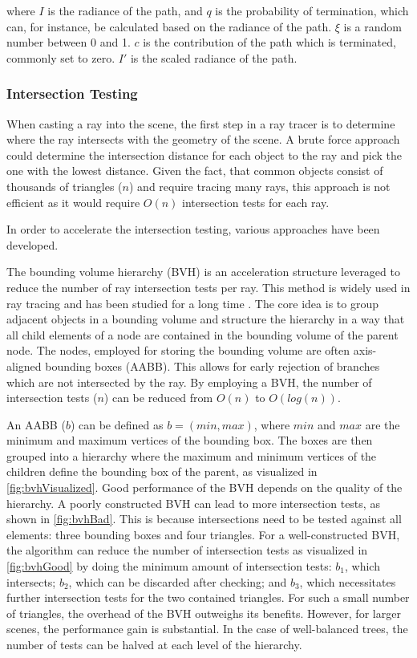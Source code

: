 where $I$ is the radiance of the path, and $q$ is the probability of termination, which can, for instance, be calculated based on the radiance of the path. $\xi$ is a random number between 0 and 1. $c$ is the contribution of the path which is terminated, commonly set to zero. $I'$ is the scaled radiance of the path.

\subsubsection{Intersection Testing}

When casting a ray into the scene, the first step in a ray tracer is to determine where the ray intersects with the geometry of the scene. A brute force approach could determine the intersection distance for each object to the ray and pick the one with the lowest distance. Given the fact, that common objects consist of thousands of triangles ($n$) and require tracing many rays, this approach is not efficient as it would require $O(n)$ intersection tests for each ray.

In order to accelerate the intersection testing, various approaches have been developed.

The bounding volume hierarchy (\gls{BVH}) is an acceleration structure leveraged to reduce the number of ray intersection tests per ray. This method is widely used in ray tracing and has been studied for a long time \cite{rubinWhittedBvh}. The core idea is to group adjacent objects in a bounding volume and structure the hierarchy in a way that all child elements of a node are contained in the bounding volume of the parent node. The nodes, employed for storing the bounding volume are often axis-aligned bounding boxes (\gls{AABB}). This allows for early rejection of branches which are not intersected by the ray. By employing a \gls{BVH}, the number of intersection tests ($n$) can be reduced from $O(n)$ to $O(log(n))$.

An \gls{AABB} ($b$) can be defined as $b = (min, max)$, where $min$ and $max$ are the minimum and maximum vertices of the bounding box. The boxes are then grouped into a hierarchy where the maximum and minimum vertices of the children define the bounding box of the parent, as visualized in \autoref{fig:bvhVisualized}. Good performance of the \gls{BVH} depends on the quality of the hierarchy. A poorly constructed \gls{BVH} can lead to more intersection tests, as shown in \autoref{fig:bvhBad}. This is because intersections need to be tested against all elements: three bounding boxes and four triangles. For a well-constructed \gls{BVH}, the algorithm can reduce the number of intersection tests as visualized in \autoref{fig:bvhGood} by doing the minimum amount of intersection tests: $b_1$, which intersects; $b_2$, which can be discarded after checking; and $b_3$, which necessitates further intersection tests for the two contained triangles. For such a small number of triangles, the overhead of the \gls{BVH} outweighs its benefits. However, for larger scenes, the performance gain is substantial. In the case of well-balanced trees, the number of tests can be halved at each level of the hierarchy.

